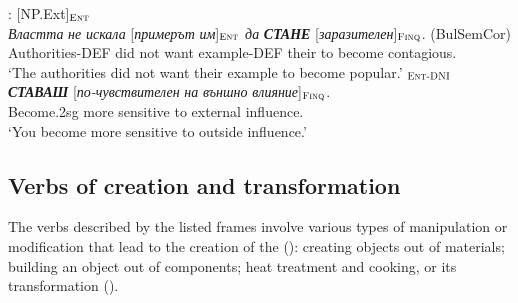 \documentclass[output=paper,colorlinks,citecolor=brown]{langscibook}
\begin{document}
 \begin{exe}
 \ex
 \begin{xlist}
\ex \label{ex21a} : [NP.Ext]$_{\text{\textsc{Ent}}}$ \\
\gll \textit{Властта} \textit{не} \textit{искала} [\textit{примерът} \textit{им}]$_{\text{\textsc{Ent}}}$ \textit{да} \textit{\textbf{СТАНЕ}} [\textit{заразителен}]$_{\text{\textsc{Finq}}}$.  (BulSemCor)\\
Authorities-DEF {did not} want example-DEF their to become contagious. {}\\
\glt `The authorities did not want their example to become popular.'
\ex \label{ex21b}
\gll [\_]$_{\text{\textsc{Ent-DNI}}}$ \textit{\textbf{СТАВАШ}} [\textit{по-чувствителен} \textit{на} \textit{външно} \textit{влияние}]$_{\text{\textsc{Finq}}}$. \\
{} Become.2sg {more sensitive} to external influence. {}\\
\glt `You become more sensitive to outside influence.'
 \end{xlist}
 \end{exe}




\subsection{Verbs of creation and transformation}\label{sec:creation}


The verbs described by the listed frames involve various types of manipulation or modification that lead to the creation of the  (): creating objects out of materials; building an object out of components; heat treatment and cooking, or its transformation ().
\end{document}
